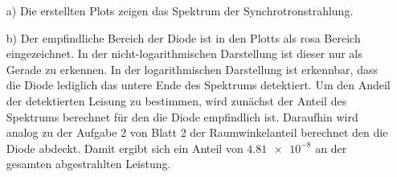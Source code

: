 \documentclass[11pt,a4paper]{article}
\begin{document}
    \begin{enumerate}
        \item[a)] Die erstellten Plots zeigen das Spektrum der Synchrotronstrahlung.
        \item[b)] Der empfindliche Bereich der Diode ist in den Plotts als rosa Bereich eingezeichnet.
            In der nicht-logarithmischen Darstellung ist dieser nur als Gerade zu erkennen.
            In der logarithmischen Darstellung ist erkennbar, 
            dass die Diode lediglich das untere Ende des Spektrums detektiert.
            Um den Andeil der detektierten Leisung zu bestimmen,
            wird zunächst der Anteil des Spektrums berechnet für den die Diode empfindlich ist.
            Daraufhin wird analog zu der Aufgabe 2 von Blatt 2 der Raumwinkelanteil berechnet den die Diode abdeckt.
            Damit ergibt sich ein Anteil von $\num{4.81e-8}$ an der gesamten abgestrahlten Leistung.  
    

    \end{enumerate}
\end{document}
